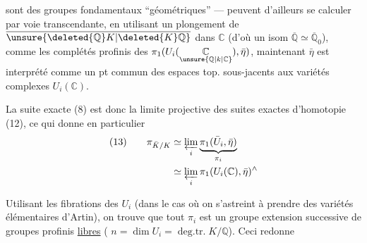 sont des groupes fondamentaux ``géométriques'' ---  peuvent d'ailleurs se calculer par voie transcendante, en utilisant un plongement de $\overline{\unsure{\deleted{\mathbb Q}K|\deleted{K}\mathbb Q}}$ dans $\mathbb C$ (d'où un isom $\overline{\mathbb Q}\simeq\overline{\mathbb Q}_0$), comme les complétés profinis des $\pi_1(U_i(\underset{\unsure{\mathbb Q|k|\mathbb C}}{\mathbb C}),\bar\eta)$,  maintenant $\bar\eta$ est interprété comme un pt  commun des espaces top. sous-jacents aux variétés complexes $U_i(\mathbb C)$.

La suite exacte (8) est donc la limite projective des suites exactes d'homotopie (12), ce qui donne en particulier
\[
\begin{aligned}
(13)\qquad \pi_{\bar K/K}&\simeq\varprojlim_i\underbrace{\pi_1(\bar U_i,\bar\eta)}_{\pi_i}\\
&\simeq\varprojlim_i\pi_1(U_i(\mathbb C),\bar\eta)^{\wedge}
\end{aligned}
\]

Utilisant les fibrations des $U_i$ (dans le cas où on s'astreint à prendre des variétés élémentaires d'Artin), on trouve que tout $\pi_i$ est un groupe  extension successive de  groupes profinis \uline{libres} ( $n=\dim U_i=\operatorname{deg.tr.}K/\mathbb Q$). Ceci redonne
